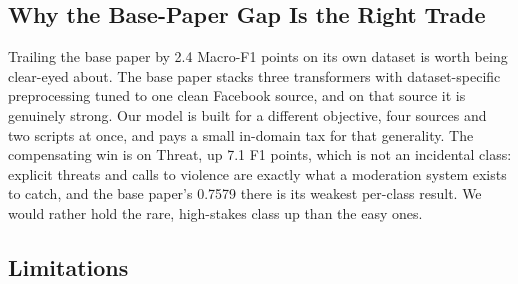 \documentclass[11pt,a4paper]{article}
\def\emph#1{#1}%
\begin{document}
\subsection{Why the Base-Paper Gap Is the Right Trade}
\label{sec:discussion-basepaper}

Trailing the base paper by 2.4 Macro-F1 points on its own dataset is worth being clear-eyed about. The base paper stacks three transformers with dataset-specific preprocessing tuned to one clean Facebook source, and on that source it is genuinely strong. Our model is built for a different objective, four sources and two scripts at once, and pays a small in-domain tax for that generality. The compensating win is on \emph{Threat}, up 7.1 F1 points, which is not an incidental class: explicit threats and calls to violence are exactly what a moderation system exists to catch, and the base paper's 0.7579 there is its weakest per-class result. We would rather hold the rare, high-stakes class up than the easy ones.

\subsection{Limitations}
\label{sec:limitations}
\end{document}
